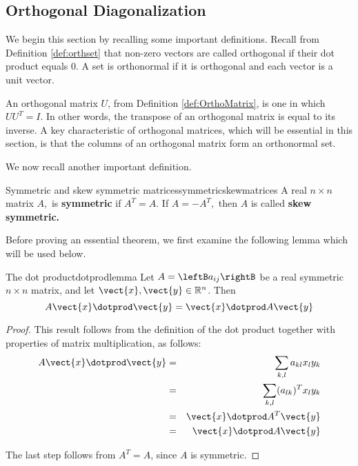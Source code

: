\subsection{Orthogonal Diagonalization}

We begin this section by recalling some important definitions. Recall from Definition \ref{def:orthset} that non-zero vectors are called orthogonal if their dot product equals $0$.  A set is orthonormal if it is orthogonal and each vector is a unit vector. 

An orthogonal matrix $U$, from Definition \ref{def:OrthoMatrix}, is one in which $UU^{T} = I$. In other words, the transpose of an orthogonal matrix is equal to its inverse. A key characteristic of orthogonal matrices, which will be essential in this section, is that the columns of an orthogonal matrix form an orthonormal set. 

We now recall another important definition. 

\begin{definition}{Symmetric and skew symmetric matrices}{symmetricskewmatrices}
A real $n\times n$ matrix $A,$ is \textbf{symmetric }if $A^{T}=A.$ If $%
A=-A^{T},$ then $A$ is called \textbf{skew symmetric. }
\end{definition}

Before proving an essential theorem, we first examine the following lemma which will be used below.

\begin{lemma}{The dot product}{dotprodlemma}
Let $A=\leftB a_{ij} \rightB$ be a real symmetric $n \times n$ matrix, and let $\vect{x}, \vect{y} \in \mathbb{R}^n$. Then
\[
A\vect{x} \dotprod \vect{y} = \vect{x} \dotprod A \vect{y}
\]
\end{lemma}

\begin{proof}
This result follows from the definition of the dot product together with properties of matrix multiplication, as follows:
\begin{eqnarray*}
A\vect{x} \dotprod \vect{y} &=& \sum_{k,l}a_{kl}x_{l}y_{k} \\
&=&\sum_{k,l} (a_{lk})^Tx_{l}y_{k} \\
&=& \vect{x}\dotprod A^{T}\vect{y} \\
&=& \vect{x}\dotprod A \vect{y}
\end{eqnarray*}

The last step follows from $A^T = A$, since $A$ is symmetric. 
\end{proof}

